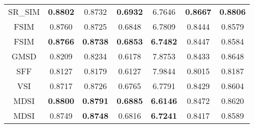 \begin{table}[htb]
\begin{tabular}{c|cccc|cc}
SR\_SIM \cite{SRSIM}                    & \textbf{0.8802} & 0.8732          & \textbf{0.6932} & 6.7646 & \textbf{0.8667} & \textbf{0.8806} \\
FSIM \cite{FSIM}                       & 0.8760          & 0.8725          & 0.6848          & 6.7809          & 0.8444          & 0.8579  \\
FSIM \cite{FSIM}     & \textbf{0.8766} & \textbf{0.8738}          & \textbf{0.6853} & \textbf{6.7482} & 0.8447          & 0.8584  \\
GMSD \cite{GMSD}                       & 0.8209          & 0.8234          & 0.6178          & 7.8753          & 0.8433          & 0.8648    \\
SFF \cite{SFF}                        & 0.8127          & 0.8179          & 0.6127          & 7.9844          & 0.8015          & 0.8187     \\
VSI \cite{VSI}                        & 0.8717          & 0.8726          & 0.6765          & 6.7791          & 0.8429          & 0.8604      \\
MDSI                       & \textbf{0.8800} & \textbf{0.8791} & \textbf{0.6885} & \textbf{6.6146} & 0.8472          & 0.8620         \\
MDSI                       & 0.8749 & \textbf{0.8748} & 0.6816 & \textbf{6.7241} & 0.8417          & 0.8589          \\
\hline
\end{tabular}
\label{synthetic}
\end{table}




